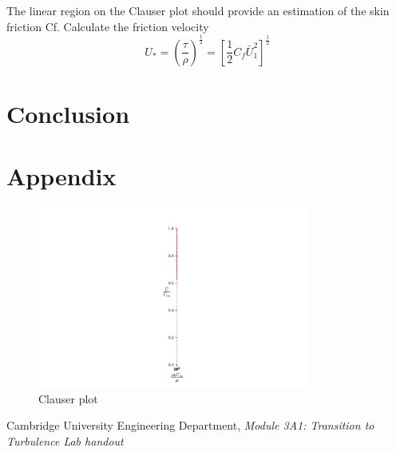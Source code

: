 \documentclass{article}
\begin{document}

The linear region on the Clauser plot should provide an estimation of the skin friction Cf.
Calculate the friction velocity
\begin{equation}
    U_* = \left( \frac{\tau}{\rho} \right)^{\frac{1}{2}} = \left[ \frac{1}{2}C_f \bar{ U}_1^2 \right]^{\frac{1}{2}}
\end{equation}




\section{Conclusion}



\section{Appendix}

\begin{figure}[H]
    \centering
    \includegraphics[width=0.8\textwidth]{clauser_data.png}
    \caption{Clauser plot}
    \label{fig:clauser}
\end{figure}

\begin{thebibliography}{9}
    Cambridge University Engineering Department, \textit{Module 3A1: Transition to Turbulence Lab handout}
\end{thebibliography}
\end{document}

